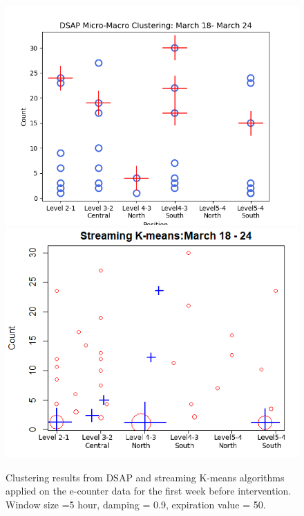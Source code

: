\begin{figure}[]
    \centering
    \includegraphics[width=.49\textwidth]{image/Chapters/Chapter6/before5hour-samp 9.preference 4.No Thre.png}%
    \includegraphics[width=.49\textwidth]{image/Chapters/Chapter6/streamKbefore1.png}
    \caption{Clustering results from DSAP and streaming K-means algorithms applied on the e-counter data for the first week before intervention. Window size =5 hour, damping = 0.9, expiration value = 50.}
    \label{26}
\end{figure}





